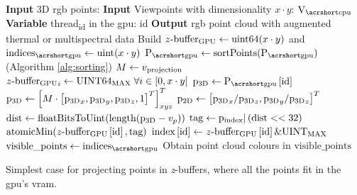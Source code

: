 \begin{algorithm}
      \small
      \begin{algorithmic}[1]
        \State \textbf{Input} 3D \acrshort{rgb} points: \Points %
    	\State \textbf{Input} Viewpoints with dimensionality $x \cdot y$: $\Viewpoints$ %
        \State \textbf{Variable} \textrm{thread}\textsubscript{id} in the \acrshort{gpu}: id %
        \State \textbf{Output} \acrshort{rgb} point cloud with augmented thermal or multispectral data %
        \State Build $z\textrm{-buffer}\textsubscript{GPU} \gets \textrm{uint64}(x \cdot y)$ and $\Indices \gets \textrm{uint}(x \cdot y)$ %
            \State $\Points \gets \textrm{sortPoints}(\Points)$   \Comment(Algorithm \ref{alg:sorting}) %
        \EndIf
                \State $M \gets v\textsubscript{projection}$ %
                    \State $z\textrm{-buffer}\textsubscript{GPU}_{i} \gets \textrm{UINT64\textsubscript{MAX}} \hspace{1mm} \forall i \in \left[0, x \cdot y\right[$ %
                \EndProcedure
                    \State $\Pointa \gets \Points\left[\textrm{id}\right]$ %
                    \State $\textrm{p}\textsubscript{3D} \gets \left[M \cdot \left[\textrm{p}\textsubscript{3D}_x, \textrm{p}\textsubscript{3D}_y, \textrm{p}\textsubscript{3D}_z, 1\right]^T\right]_{xyz}^T$ %
                    \State $\textrm{p}\textsubscript{2D} \gets \left[\textrm{p}\textsubscript{3D}_x / \textrm{p}\textsubscript{3D}_z, \textrm{p}\textsubscript{3D}_y / \textrm{p}\textsubscript{3D}_z\right]^T$ %
                        \State $\textrm{dist} \gets \textrm{floatBitsToUint}(\textrm{length}(\textrm{p}\textsubscript{3D} - v_p))$ %
                        \State $\textrm{tag} \gets \textrm{p}\textsubscript{index} | \left(\textrm{dist} << 32\right)$ %
                        \State $\textrm{atomicMin}(z\textrm{-buffer}\textsubscript{GPU}\left[\textrm{id}\right], \textrm{tag})$ %
                    \EndIf
                \EndProcedure
                    \State $\textrm{index}\left[\textrm{id}\right] \gets z\textrm{-buffer}\textsubscript{GPU}\left[\textrm{id}\right] \& \textrm{UINT\textsubscript{MAX}}$ %
                \EndProcedure
                \State $\textrm{visible\_points} \gets \Indices$ %
                \State Obtain point cloud colours in $\textrm{visible\_points}$ %
            \EndFor
        \EndProcedure
        \caption{Simplest case for projecting points in \textit{z}-buffers, where all the points fit in the \acrshort{gpu}'s \acrshort{vram}.}
        \label{alg:gpu_single_batch}
      \end{algorithmic}
      \normalsize
\end{algorithm}

